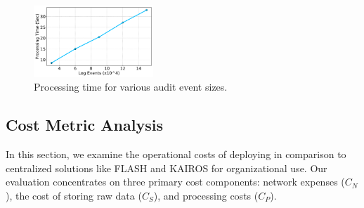  \begin{figure}[t!]
  \centering
  \includegraphics[width=0.4\textwidth]{fig/sizevstime.pdf}
  \caption{Processing time for various audit event sizes. }
  \label{sizevstime}
  \vspace{-2ex}
\end{figure}




\subsection{Cost Metric Analysis}
In this section, we examine the operational costs of deploying \Sys in comparison to centralized solutions like FLASH and KAIROS for organizational use. Our evaluation concentrates on three primary cost components: network expenses (\(C_{N}\)), the cost of storing raw data (\(C_{S}\)), and processing costs (\(C_{P}\)).

